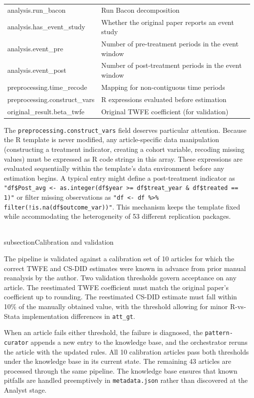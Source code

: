 \begin{longtable}{>{\ttfamily\footnotesize\raggedright}p{6.0cm} >{\small\raggedright\arraybackslash}p{9.0cm}}
analysis.run\_bacon & Run Bacon decomposition \\
analysis.has\_event\_study & Whether the original paper reports an event study \\
analysis.event\_pre & Number of pre-treatment periods in the event window \\
analysis.event\_post & Number of post-treatment periods in the event window \\[3pt]
preprocessing.time\_recode & Mapping for non-contiguous time periods \\
preprocessing.construct\_vars & R expressions evaluated before estimation \\[3pt]
original\_result.beta\_twfe & Original TWFE coefficient (for validation) \\

\end{longtable}

The \texttt{preprocessing.construct\_vars} field deserves particular attention. Because the R template is never modified, any article-specific data manipulation (constructing a treatment indicator, creating a cohort variable, recoding missing values) must be expressed as R code strings in this array. These expressions are evaluated sequentially within the template's data environment before any estimation begins. A typical entry might define a post-treatment indicator as \verb|"df$Post_avg <- as.integer(df$year >= df$treat_year & df$treated == 1)"| or filter missing observations as \verb|"df <- df %>% filter(!is.na(df$outcome_var))"|. This mechanism keeps the template fixed while accommodating the heterogeneity of 53 different replication packages.


\\subsection{Calibration and validation}
\label{sec:appc_calibration}

The pipeline is validated against a calibration set of 10 articles for which the correct TWFE and CS-DID estimates were known in advance from prior manual reanalysis by the author. Two validation thresholds govern acceptance on any article. The reestimated TWFE coefficient must match the original paper's coefficient up to rounding. The reestimated CS-DID estimate must fall within 10\% of the manually obtained value, with the threshold allowing for minor R-vs-Stata implementation differences in \texttt{att\_gt}.

When an article fails either threshold, the failure is diagnosed, the \texttt{pattern-curator} appends a new entry to the knowledge base, and the orchestrator reruns the article with the updated rules. All 10 calibration articles pass both thresholds under the knowledge base in its current state. The remaining 43 articles are processed through the same pipeline. The knowledge base ensures that known pitfalls are handled preemptively in \texttt{metadata.json} rather than discovered at the Analyst stage.


